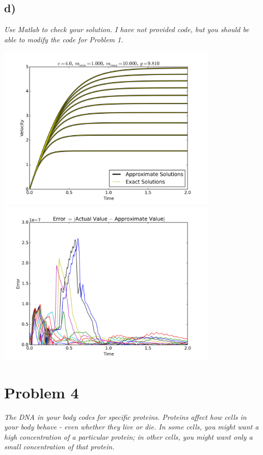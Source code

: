 \documentclass[12pt]{article}
\begin{document}
\subsection*{ d)}
{\it Use Matlab to check your solution.  I have not provided code, but you should be able to modify the code for Problem 1.}

\begin{center}
	\includegraphics[width=400px]{figures/3_d_1.png}
	\includegraphics[width=400px]{figures/3_d_2.png}
\end{center}

\section*{Problem 4}
{\it The DNA in your body codes for specific proteins.  Proteins affect how cells in your body behave - even whether they live or die.  In some cells, you might want a high concentration of a particular protein; in other cells, you might want only a small concentration of that protein.}\\
\end{document}
